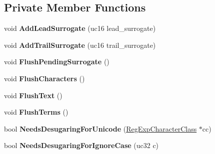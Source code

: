 \subsection*{Private Member Functions}
\begin{DoxyCompactItemize}
\item 
void {\bfseries Add\+Lead\+Surrogate} (uc16 lead\+\_\+surrogate)\hypertarget{classv8_1_1internal_1_1_reg_exp_builder_a0c168a96709cfd1302bade18769530aa}{}\label{classv8_1_1internal_1_1_reg_exp_builder_a0c168a96709cfd1302bade18769530aa}

\item 
void {\bfseries Add\+Trail\+Surrogate} (uc16 trail\+\_\+surrogate)\hypertarget{classv8_1_1internal_1_1_reg_exp_builder_a471e925cdee9ce5cfb693dc913ca985d}{}\label{classv8_1_1internal_1_1_reg_exp_builder_a471e925cdee9ce5cfb693dc913ca985d}

\item 
void {\bfseries Flush\+Pending\+Surrogate} ()\hypertarget{classv8_1_1internal_1_1_reg_exp_builder_a94e932e467354672fee8781103202874}{}\label{classv8_1_1internal_1_1_reg_exp_builder_a94e932e467354672fee8781103202874}

\item 
void {\bfseries Flush\+Characters} ()\hypertarget{classv8_1_1internal_1_1_reg_exp_builder_ac6a93ad66dadf4ce66f59a420f6fb81d}{}\label{classv8_1_1internal_1_1_reg_exp_builder_ac6a93ad66dadf4ce66f59a420f6fb81d}

\item 
void {\bfseries Flush\+Text} ()\hypertarget{classv8_1_1internal_1_1_reg_exp_builder_adb8a841090c3afaedea2c8179d29af99}{}\label{classv8_1_1internal_1_1_reg_exp_builder_adb8a841090c3afaedea2c8179d29af99}

\item 
void {\bfseries Flush\+Terms} ()\hypertarget{classv8_1_1internal_1_1_reg_exp_builder_a207df2da7432608f9ee8097e2a6d5642}{}\label{classv8_1_1internal_1_1_reg_exp_builder_a207df2da7432608f9ee8097e2a6d5642}

\item 
bool {\bfseries Needs\+Desugaring\+For\+Unicode} (\hyperlink{classv8_1_1internal_1_1_reg_exp_character_class}{Reg\+Exp\+Character\+Class} $\ast$cc)\hypertarget{classv8_1_1internal_1_1_reg_exp_builder_a80d798448a2e507e2eb6a747f6a7d121}{}\label{classv8_1_1internal_1_1_reg_exp_builder_a80d798448a2e507e2eb6a747f6a7d121}

\item 
bool {\bfseries Needs\+Desugaring\+For\+Ignore\+Case} (uc32 c)\hypertarget{classv8_1_1internal_1_1_reg_exp_builder_ae6c94e320f615d818dbbbd3658a9e9d4}{}\label{classv8_1_1internal_1_1_reg_exp_builder_ae6c94e320f615d818dbbbd3658a9e9d4}


\end{DoxyCompactItemize}
